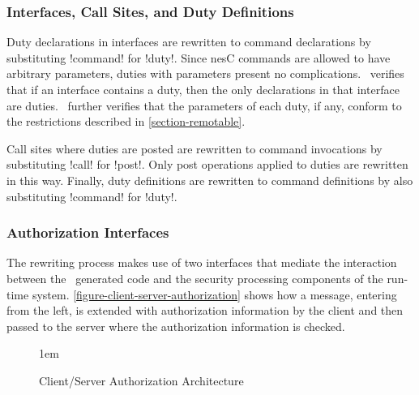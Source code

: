 
\subsubsection{Interfaces, Call Sites, and Duty Definitions}

Duty declarations in interfaces are rewritten to command declarations by substituting !command!
for !duty!. Since nesC commands are allowed to have arbitrary parameters, duties with parameters
present no complications. \Sprocket\ verifies that if an interface contains a duty, then the
only declarations in that interface are duties. \Sprocket\ further verifies that the parameters
of each duty, if any, conform to the restrictions described in \autoref{section-remotable}.


Call sites where duties are posted are rewritten to command invocations by substituting !call!
for !post!. Only post operations applied to duties are rewritten in this way. Finally, duty
definitions are rewritten to command definitions by also substituting !command! for !duty!.

\subsubsection{Authorization Interfaces}

The rewriting process makes use of two interfaces that mediate the interaction between the
\Sprocket\ generated code and the security processing components of the run-time system.
\autoref{figure-client-server-authorization} shows how a message, entering from the left, is
extended with authorization information by the client and then passed to the server where the
authorization information is checked.

\begin{figure}[htbp]
  
  \centerline{\raise 1em\box\graph}
  \caption{Client/Server Authorization Architecture}
  \label{figure-client-server-authorization}
\end{figure}

